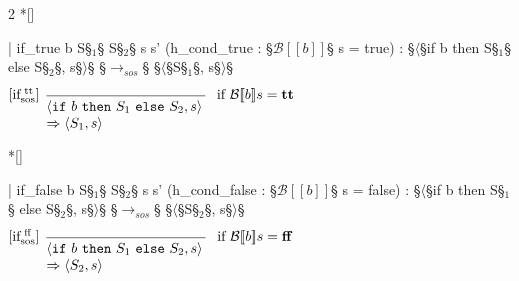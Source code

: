 \begin{paracol}{2}
\switchcolumn[1]*[]
\begin{leftcolumn}
    \begin{Lean_Code}
  | if_true {b S§$_{1}$§ S§$_{2}$§ s s'}
    (h_cond_true :
      §\(\mathcal{B}[\![b]\!]\)§ s = true) : 
    §\(\langle\)§if b then S§$_{1}$§ else S§$_{2}$§, s§\(\rangle\)§
      §\(\to_{sos}\)§ §\(\langle\)§S§$_{1}$§, s§\(\rangle\)§
        \end{Lean_Code}
    \end{leftcolumn}
    \begin{rightcolumn}
        \vspace{3.6em}
            \(
\begin{prooftree}
  \hypo{} %
  \infer[
    left label={[if$_{\text{sos}}^{\text{\ tt}}$]}
    ]1[
    if $\mathcal{B}[\![b]\!]s = \mathbf{tt}$
    ]{
        \parbox{4cm}{$
    \langle \mathtt{if}\ b\ \mathtt{then}\ S_1\ \mathtt{else}\ S_2, s \rangle \\
    \Rightarrow \langle S_1, s\rangle
        $}
    }
\end{prooftree}
    \)
\end{rightcolumn}

\switchcolumn[1]*[]
\begin{leftcolumn}
    \begin{Lean_Code}
  | if_false {b S§$_{1}$§ S§$_{2}$§ s s'}
    (h_cond_false :
      §\(\mathcal{B}[\![b]\!]\)§ s = false) : 
    §\(\langle\)§if b then S§$_{1}$§ else S§$_{2}$§, s§\(\rangle\)§
      §\(\to_{sos}\)§ §\(\langle\)§S§$_{2}$§, s§\(\rangle\)§
    \end{Lean_Code}
\end{leftcolumn}
\begin{rightcolumn}
\vspace{3.6em}
    \(
\begin{prooftree}
  \hypo{} %
  \infer[
    left label={[if$_{\text{sos}}^{\text{\ ff}}$]}
    ]1[
    if $\mathcal{B}[\![b]\!]s = \mathbf{ff}$
    ]{
        \parbox{4cm}{$
    \langle \mathtt{if}\ b\ \mathtt{then}\ S_1\ \mathtt{else}\ S_2, s \rangle \\
    \Rightarrow \langle S_2, s\rangle
        $}
    }
\end{prooftree}
            \)
    \end{rightcolumn}


\end{paracol}

